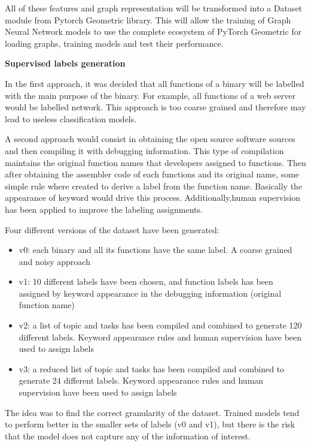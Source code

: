 All of these features and graph representation will be transformed into a Dataset module from Pytorch Geometric library. This will allow the training of Graph Neural Network models to use the complete ecosystem of PyTorch Geometric for loading graphs, training models and test their performance.




\textbf{Supervised labels generation}


In the first approach, it was decided that all functions of a binary will be labelled with the main purpose of the binary. For example, all functions of a web server would be labelled network. This approach is too coarse grained and therefore may lead to useless classification models.
 
A second approach would consist in obtaining the open source software sources and then compiling it with debugging information. This type of compilation maintains the original function names that developers assigned to functions. Then after obtaining the assembler code of each functions and its original name, some simple rule where created to derive a label from the function name. Basically the appearance of keyword would drive this process. Additionally,human supervision has been applied to improve the labeling assignments. 

Four different versions of the dataset have been generated:
\begin{itemize}
	\item v0: each binary and all its functions have the same label. A coarse grained and noisy approach
	\item v1: 10 different labels have been chosen, and function labels has been assigned by keyword appearance in the debugging information (original function name)
	\item v2: a list of topic and tasks has been compiled and combined to generate 120 different labels. Keyword appearance rules and human supervision have been used to assign labels
	\item v3: a reduced list of topic and tasks has been compiled and combined to generate 24 different labels. Keyword appearance rules and human supervision have been used to assign labels
\end{itemize}
The idea was to find the correct granularity of the dataset. Trained models tend to perform better in the smaller sets of labels (v0 and v1), but there is the risk that the model does not capture any of the information of interest. 



